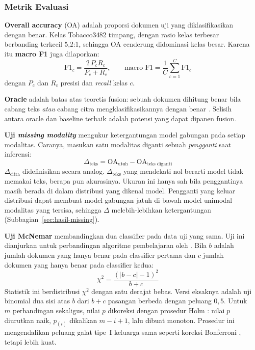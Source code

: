 \subsubsection{Metrik Evaluasi}

\textbf{Overall accuracy} (OA) adalah proporsi dokumen uji yang diklasifikasikan dengan
benar. Kelas Tobacco3482 timpang, dengan rasio kelas terbesar berbanding terkecil
5,2:1, sehingga OA cenderung didominasi kelas besar. Karena itu \textbf{macro F1} juga
dilaporkan:
\begin{equation}\label{eq:macrof1}
  \mathrm{F1}_c = \frac{2\, P_c R_c}{P_c + R_c}, \qquad
  \text{macro F1} = \frac{1}{C} \sum_{c=1}^{C} \mathrm{F1}_c
\end{equation}
dengan $P_c$ dan $R_c$ presisi dan \textit{recall} kelas $c$.

\textbf{Oracle} adalah batas atas teoretis fusion: sebuah dokumen dihitung benar bila
cabang teks \emph{atau} cabang citra mengklasifikasikannya dengan benar
\parencite{audebert2020}. Selisih antara oracle dan baseline terbaik adalah potensi yang
dapat dipanen fusion.

\textbf{Uji \textit{missing modality}} mengukur ketergantungan model gabungan pada setiap
modalitas. Caranya, masukan satu modalitas diganti sebuah \emph{pengganti} saat inferensi:
\begin{equation}\label{eq:delta}
  \Delta_\text{teks} = \mathrm{OA}_\text{utuh} - \mathrm{OA}_\text{teks diganti}
\end{equation}
$\Delta_\text{citra}$ didefinisikan secara analog. $\Delta_\text{teks}$ yang mendekati nol
berarti model tidak memakai teks, berapa pun akurasinya. Ukuran ini hanya sah bila
penggantinya masih berada di dalam distribusi yang dikenal model. Pengganti yang keluar
distribusi dapat membuat model gabungan jatuh di bawah model unimodal modalitas yang
tersisa, sehingga $\Delta$ melebih-lebihkan ketergantungan
(Subbagian~\ref{sec:hasil-missing}).

\textbf{Uji McNemar} \parencite{mcnemar1947} membandingkan dua classifier pada data uji
yang sama. Uji ini dianjurkan untuk perbandingan algoritme pembelajaran oleh
\textcite{dietterich1998}. Bila $b$ adalah jumlah dokumen yang hanya benar pada classifier
pertama dan $c$ jumlah dokumen yang hanya benar pada classifier kedua:
\begin{equation}\label{eq:mcnemar}
  \chi^2 = \frac{(|b - c| - 1)^2}{b + c}
\end{equation}
Statistik ini berdistribusi $\chi^2$ dengan satu derajat bebas. Versi eksaknya adalah uji
binomial dua sisi atas $b$ dari $b + c$ pasangan berbeda dengan peluang $0{,}5$. Untuk $m$
perbandingan sekaligus, nilai $p$ dikoreksi dengan prosedur Holm \parencite{holm1979}:
nilai $p$ diurutkan naik, $p_{(i)}$ dikalikan $m - i + 1$, lalu dibuat monoton. Prosedur
ini mengendalikan peluang galat tipe~I keluarga sama seperti koreksi Bonferroni
\parencite{dunn1961}, tetapi lebih kuat.

